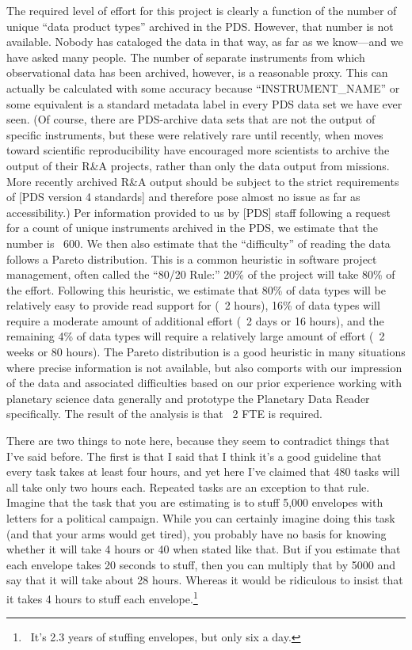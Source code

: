 \documentclass[12pt,oneside]{book}
\begin{document}
\begin{displayquote}
The required level of effort for this project is clearly a function of the number of unique ``data product types'' archived in the PDS. However, that number is not available. Nobody has cataloged the data in that way, as far as we know---and we have asked many people. The number of separate instruments from which observational data has been archived, however, is a reasonable proxy. This can actually be calculated with some accuracy because ``INSTRUMENT\_NAME'' or some equivalent is a standard metadata label in every PDS data set we have ever seen. (Of course, there are PDS-archive data sets that are not the output of specific instruments, but these were relatively rare until recently, when moves toward scientific reproducibility have encouraged more scientists to archive the output of their R\&A projects, rather than only the data output from missions. More recently archived R\&A output should be subject to the strict requirements of [PDS version 4 standards] and therefore pose almost no issue as far as accessibility.) Per information provided to us by [PDS] staff following a request for a count of unique instruments archived in the PDS, we estimate that the number is ~600. We then also estimate that the ``difficulty'' of reading the data follows a Pareto distribution. This is a common heuristic in software project management, often called the ``80/20 Rule:'' 20\% of the project will take 80\% of the effort. Following this heuristic, we estimate that 80\% of data types will be relatively easy to provide read support for (~2 hours), 16\% of data types will require a moderate amount of additional effort (~2 days or 16 hours), and the remaining 4\% of data types will require a relatively large amount of effort (~2 weeks or 80 hours). The Pareto distribution is a good heuristic in many situations where precise information is not available, but also comports with our impression of the data and associated difficulties based on our prior experience working with planetary science data generally and prototype the Planetary Data Reader specifically. The result of the analysis is that ~2 FTE is required.
\end{displayquote}

There are two things to note here, because they seem to contradict things that I've said before. The first is that I said that I think it's a good guideline that every task takes at least four hours, and yet here I've claimed that 480 tasks will all take only two hours each. Repeated tasks are an exception to that rule. Imagine that the task that you are estimating is to stuff 5,000 envelopes with letters for a political campaign. While you can certainly imagine doing this task (and that your arms would get tired), you probably have no basis for knowing whether it will take 4 hours or 40 when stated like that. But if you estimate that each envelope takes 20 seconds to stuff, then you can multiply that by 5000 and say that it will take about 28 hours. Whereas it would be ridiculous to insist that it takes 4 hours to stuff each envelope.\footnote{ It's 2.3 years of stuffing envelopes, but only six a day.}
\end{document}
